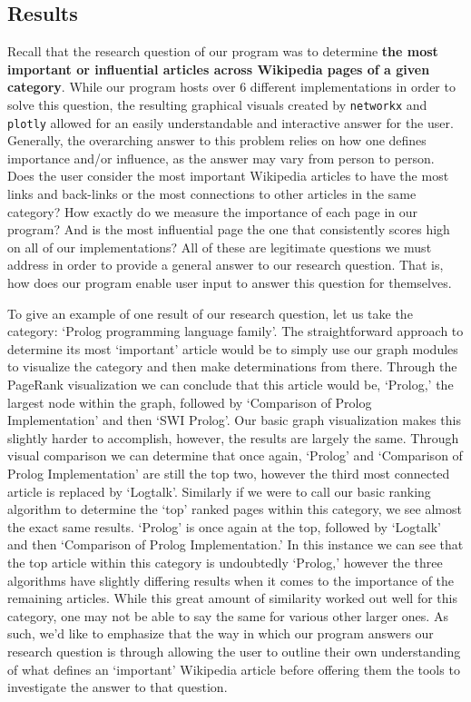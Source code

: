 \documentclass[fontsize=11pt]{article}
\begin{document}
\subsection{Results}
Recall that the research question of our program was to determine \textbf{the most important or influential articles across Wikipedia pages of a given category}. While our program hosts over 6 different implementations in order to solve this question, the resulting graphical visuals created by \texttt{networkx} and \texttt{plotly} allowed for an easily understandable and interactive answer for the user. Generally, the overarching answer to this problem relies on how one defines importance and/or influence, as the answer may vary from person to person. Does the user consider the most important Wikipedia articles to have the most links and back-links or the most connections to other articles in the same category? How exactly do we measure the importance of each page in our program? And is the most influential page the one that consistently scores high on all of our implementations? All of these are legitimate questions we must address in order to provide a general answer to our research question. That is, how does our program enable user input to answer this question for themselves. 

To give an example of one result of our research question, let us take the category: `Prolog programming language family'. The straightforward approach to determine its most `important' article would be to simply use our graph modules to visualize the category and then make determinations from there. Through the PageRank visualization we can conclude that this article would be, `Prolog,' the largest node within the graph, followed by `Comparison of Prolog Implementation' and then `SWI Prolog'. Our basic graph visualization makes this slightly harder to accomplish, however, the results are largely the same. Through visual comparison we can determine that once again, `Prolog' and `Comparison of Prolog Implementation' are still the top two, however the third most connected article is replaced by `Logtalk'. Similarly if we were to call our basic ranking algorithm to determine the `top' ranked pages within this category, we see almost the exact same results. `Prolog' is once again at the top, followed by `Logtalk' and then `Comparison of Prolog Implementation.' In this instance we can see that the top article within this category is undoubtedly `Prolog,' however the three algorithms have slightly differing results when it comes to the importance of the remaining articles. While this great amount of similarity worked out well for this category, one may not be able to say the same for various other larger ones. As such, we'd like to emphasize that the way in which our program answers our research question is through allowing the user to outline their own understanding of what defines an `important' Wikipedia article before offering them the tools to investigate the answer to that question.
\end{document}
